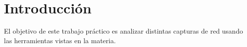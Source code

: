 \section{Introducción}

El objetivo de este trabajo práctico es analizar distintas capturas de red usando las herramientas vistas en la materia.